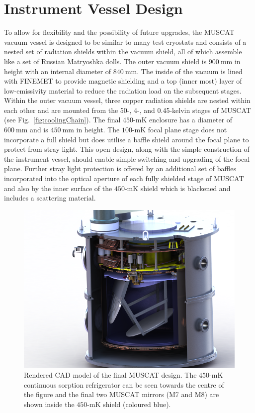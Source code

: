\documentclass{spie}
\begin{document}
\section{Instrument Vessel Design}
To allow for flexibility and the possibility of future upgrades, the MUSCAT vacuum vessel is designed to be similar to many test cryostats and consists of a nested set of radiation shields within the vacuum shield, all of which assemble like a set of Russian Matryoshka dolls. The outer vacuum shield is $900~\si{\milli\metre}$ in height with an internal diameter of $840~\si{\milli\metre}$. The inside of the vacuum is lined with FINEMET to provide magnetic shielding and a top (inner most) layer of low-emissivity material to reduce the radiation load on the subsequent stages. Within the outer vacuum vessel, three copper radiation shields are nested within each other and are mounted from the 50-, 4-, and 0.45-kelvin stages of MUSCAT (see Fig.~\ref{fig:coolingChain}). The final $450\mbox{-}\si{\milli\kelvin}$ enclosure has a diameter of $600~\si{\milli\metre}$ and is $450~\si{\milli\metre}$ in height. The $100\mbox{-}\si{\milli\kelvin}$ focal plane stage does not incorporate a full shield but does utilise a baffle shield around the focal plane to protect from stray light. This open design, along with the simple construction of the instrument vessel, should enable simple switching and upgrading of the focal plane. Further stray light protection is offered by an additional set of baffles incorporated into the optical aperture of each fully shielded stage of MUSCAT and also by the inner surface of the $450\mbox{-}\si{\milli\kelvin}$ shield which is blackened and includes a scattering material.
\begin{figure}[tb]
\centering
\includegraphics[height=0.45\textheight]{MUSCAT_xSection}
\caption{Rendered CAD model of the final MUSCAT design. The $450\mbox{-}\si{\milli\kelvin}$ continuous sorption refrigerator can be seen towards the centre of the figure and the final two MUSCAT mirrors (M7 and M8) are shown inside the $450\mbox{-}\si{\milli\kelvin}$ shield (coloured blue).}\label{fig:CAD}
\end{figure}
\end{document}
